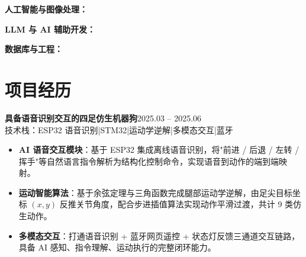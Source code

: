 \documentclass[10pt,a4paper]{article}
\newcommand{\projectblock}[3]{%
    {\bfseries\color{darktext}#1}\hfill{\color{graytext}#2}\\%
    {\small\color{graytext}#3}%
    \vspace{0.2em}%
}
\begin{document}
\vspace{2pt}

{\bfseries\color{primary}人工智能与图像处理：}

\vspace{2pt}

{\bfseries\color{primary}LLM 与 AI 辅助开发：}

\vspace{2pt}

{\bfseries\color{primary}数据库与工程：}

\section{\faProjectDiagram\hspace{0.4em}项目经历}

\projectblock{具备语音识别交互的四足仿生机器狗}{2025.03 -- 2025.06}{技术栈：ESP32 语音识别\hspace{0.3em}|\hspace{0.3em}STM32\hspace{0.3em}|\hspace{0.3em}运动学逆解\hspace{0.3em}|\hspace{0.3em}多模态交互\hspace{0.3em}|\hspace{0.3em}蓝牙}

\begin{itemize}[leftmargin=1.5em, itemsep=2pt, parsep=0pt, topsep=2pt]
    \item \textbf{AI 语音交互模块}：基于 ESP32 集成离线语音识别，将"前进 / 后退 / 左转 / 挥手"等自然语言指令解析为结构化控制命令，实现语音到动作的端到端映射。
    \item \textbf{运动智能算法}：基于余弦定理与三角函数完成腿部运动学逆解，由足尖目标坐标 $(x,y)$ 反推关节角度，配合步进插值算法实现动作平滑过渡，共计 9 类仿生动作。
    \item \textbf{多模态交互}：打通语音识别 + 蓝牙网页遥控 + 状态灯反馈三通道交互链路，具备 AI 感知、指令理解、运动执行的完整闭环能力。
\end{itemize}
\end{document}
